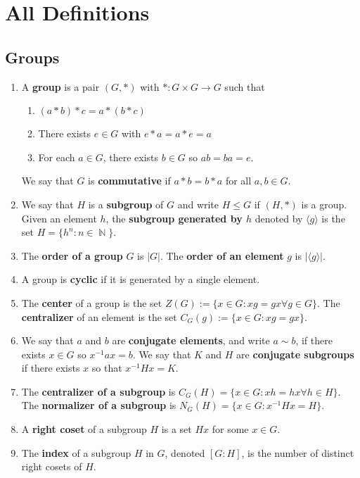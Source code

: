 \documentclass[12pt, a4paper]{article}
\DeclareMathOperator{\N}{\mathbb{N}}
\theoremstyle{nonumberplain}
\begin{document}
\section{All Definitions}
\subsection{Groups}
\begin{enumerate}[nolistsep]
    \item A \textbf{group} is a pair $(G,*)$ with $*:G\times G\to G$ such that
        \begin{enumerate}[nolistsep]
            \item $(a*b)*c=a*(b*c)$
            \item There exists $e\in G$ with $e*a=a*e=a$
            \item For each $a\in G$, there exists $b\in G$ so $ab=ba=e$.
        \end{enumerate}
        We say that $G$ is \textbf{commutative} if $a*b=b*a$ for all $a,b\in G$.
    \item We say that $H$ is a \textbf{subgroup} of $G$ and write $H\leq G$ if $(H,*)$ is a group.
        Given an element $h$, the \textbf{subgroup generated by $h$} denoted by $\langle g\rangle$ is the set $H=\{h^n:n\in\N\}$.
    \item The \textbf{order of a group} $G$ is $|G|$.
        The \textbf{order of an element} $g$ is $|\langle g\rangle|$.
    \item A group is \textbf{cyclic} if it is generated by a single element.
    \item The \textbf{center} of a group is the set $Z(G):=\{x\in G:xg=gx\forall g\in G\}$.
        The \textbf{centralizer} of an element is the set $C_G(g):=\{x\in G:xg=gx\}$.
    \item We say that $a$ and $b$ are \textbf{conjugate elements}, and write $a\sim b$, if there exists $x\in G$ so $x^{-1}ax=b$.
        We say that $K$ and $H$ are \textbf{conjugate subgroups} if there exists $x$ so that $x^{-1}Hx=K$.
    \item The \textbf{centralizer of a subgroup} is $C_G(H)=\{x\in G:xh=hx\forall h\in H\}$.
        The \textbf{normalizer of a subgroup} is $N_G(H)=\{x\in G:x^{-1}Hx=H\}$.
    \item A \textbf{right coset} of a subgroup $H$ is a set $Hx$ for some $x\in G$.
    \item The \textbf{index} of a subgroup $H$ in $G$, denoted $[G:H]$, is the number of distinct right cosets of $H$.

\end{enumerate}
\end{document}
